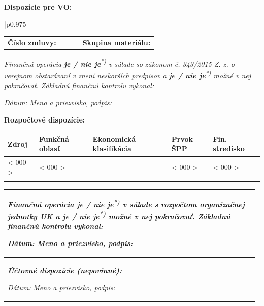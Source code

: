 \documentclass[10pt,a4paper]{article}
\newcommand{\placeholder}[1]{< #1 >}
\newcommand{\sppSymbol}{\placeholder{000}}
\newcommand{\source}{\placeholder{000}}
\newcommand{\functionalRegion}{\placeholder{000}}
\newcommand{\financialCentre}{\placeholder{000}}
\begin{document}
\vspace*{-0.5em}
\textbf{Dispozície pre VO:}
\vspace*{-1em}

\begin{table}[h!]
\centering
\begin{tabular}{|p{0.975\linewidth}|}
	\hline
	\begin{tabular}[c]{@{}p{0.5\linewidth}p{0.5\linewidth}@{}}
		\textbf{Číslo zmluvy:} & \textbf{Skupina materiálu:} \\
	\end{tabular}
	\textit{Finančná operácia \textbf{je / nie je}\textsuperscript{*)} v súlade so zákonom č. 343/2015 Z. z. o verejnom obstarávaní v znení neskorších predpisov a \textbf{je / nie je}\textsuperscript{*)} možné v nej pokračovať. Základnú finančnú kontrolu vykonal:}
	
	\textit{Dátum:} \hspace{2cm} \textit{Meno a priezvisko, podpis:} \\
	\hline
\end{tabular}
\end{table}

\vspace*{-0.5em}
\textbf{Rozpočtové dispozície:}
\vspace*{-1em}
\begin{table}[h!]
\centering
\begin{tabularx}{\linewidth}{|X|X|l|X|X|}
	\hline
	\textbf{Zdroj} & \textbf{Funkčná oblasť} & \textbf{Ekonomická klasifikácia} & \textbf{Prvok ŠPP} & \textbf{Fin. stredisko} \\ \hline
	\source & \functionalRegion & & \sppSymbol & \financialCentre \\ \hline
	& & & & \\ \hline
\end{tabularx}
\begin{tabular}{|p{0.975\linewidth}|}
	\textit{Finančná operácia \textbf{je / nie je}\textsuperscript{*)} v súlade s rozpočtom organizačnej jednotky UK a \textbf{je / nie je}\textsuperscript{*)} možné v nej pokračovať. Základnú finančnú kontrolu vykonal:}
	
	\textit{Dátum:} \hspace{2cm} \textit{Meno a priezvisko, podpis:} \\ \hline
	
	\textit{\textbf{Účtovné dispozície (nepovinné):}}
	
	\vspace*{1em}
	
	\textit{Dátum:} \hspace{2cm} \textit{Meno a priezvisko, podpis:} \\ \hline
\end{tabular}
\end{table}
\end{document}
